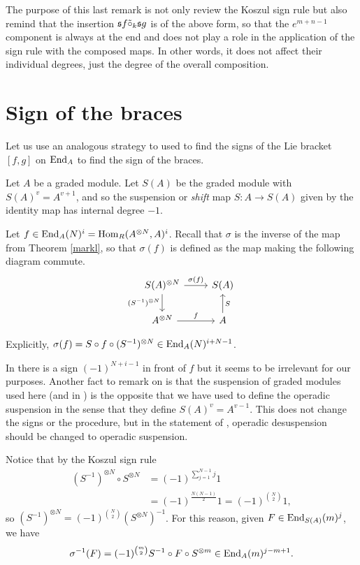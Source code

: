 \documentclass[Thesis.tex]{subfiles}
\begin{document}
The purpose of this last remark is not only review the Koszul sign rule but also remind that the insertion $\mathfrak{s} f\tilde{\circ}_{k} \mathfrak{s} g$ is of the above form, so that the $e^{m+n-1}$ component is always at the end and does not play a role in the application of the sign rule with the composed maps. In other words, it does not affect their individual degrees, just the degree of the overall composition. %

\section{Sign of the braces}\label{rw}



Let us use an analogous strategy to \cite{RW} used to find the signs of the Lie bracket $[f,g]$ on $\operatorname{End}_A$ to find the sign of the braces.

Let $A$ be a graded module. Let $S(A)$ be the graded module with $S(A)^v=A^{v+1}$, and so the suspension or \emph{shift} map $S:A\to S(A)$ given by the identity map has internal degree $-1$.

 Let $f\in \operatorname{End}_A(N)^i=\operatorname{Hom}_R(A^{\otimes N},A)^i$. Recall that $\sigma$ is the inverse of the map from Theorem \ref{markl}, so that $\sigma(f)$ is defined as the map making the following diagram commute.
\[
\begin{tikzcd}
S(A)^{\otimes N}\arrow[r, "\sigma(f)"]\arrow[d, "(S^{-1})^{\otimes N}"'] & S(A)\\
A^{\otimes N}\arrow[r,"f"] & A\arrow[u, "S"']
\end{tikzcd}
\]

Explicitly, $\sigma(f)=S\circ f\circ (S^{-1})^{\otimes N}\in \operatorname{End}_A(N)^{i+N-1}$. 

\begin{remark}
In \cite{RW} there is a sign $(-1)^{N+i-1}$ in front of $f$ but it seems to be irrelevant for our purposes. Another fact to remark on is that the suspension of graded modules used here (and in \cite{RW}) is the opposite that we have used to define the operadic suspension in the sense that they define $S(A)^v=A^{v-1}$. This does not change the signs or the procedure, but in the statement of , operadic desuspension should be changed to operadic suspension. %
\end{remark}


Notice that by the Koszul sign rule 
\begin{align*}
(S^{-1})^{\otimes N}\circ S^{\otimes N}&=(-1)^{\sum_{j=1}^{N-1} j}1\\
&=(-1)^{\frac{N(N-1)}{2}}1=(-1)^{\binom{N}{2}}1,
\end{align*}
so $(S^{-1})^{\otimes N}= (-1)^{\binom{N}{2}}(S^{\otimes N})^{-1}$. For this reason, given $F\in \operatorname{End}_{S(A)}(m)^j$, we have
\[
\sigma^{-1}(F)=(-1)^{\binom{m}{2}}S^{-1}\circ F\circ S^{\otimes m}\in \operatorname{End}_A(m)^{j-m+1}.
\]
\end{document}
